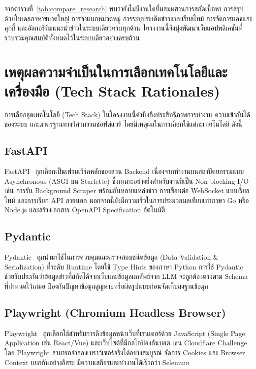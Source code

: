 จากตารางที่~\ref{tab:compare_research} พบว่ายังไม่มีงานใดที่ผสมผสานการสกัดเนื้อหา การสรุปด้วยโมเดลภาษาขนาดใหญ่ การจำแนกหมวดหมู่ การระบุประเด็นข่าวแบบเรียลไทม์ การจัดการแคชและคุกกี้ และอัลกอริทึมแนะนำข่าวในระบบเดียวครบทุกด้าน โครงงานนี้จึงมุ่งพัฒนาเว็บแอปพลิเคชันที่รวบรวมคุณสมบัติทั้งหมดไว้ในระบบเดียวอย่างครบถ้วน

\section{เหตุผลความจำเป็นในการเลือกเทคโนโลยีและเครื่องมือ (Tech Stack Rationales)}

การเลือกชุดเทคโนโลยี (Tech Stack) ในโครงงานนี้คำนึงถึงประสิทธิภาพการทำงาน ความเข้ากันได้ของระบบ และมาตรฐานทางวิศวกรรมซอฟต์แวร์ โดยมีเหตุผลในการเลือกใช้แต่ละเทคโนโลยี ดังนี้

\subsection{FastAPI}
FastAPI~\parencite{fastapi2024} ถูกเลือกเป็นเฟรมเวิร์คหลักของส่วน Backend เนื่องจากทำงานบนสถาปัตยกรรมแบบ Asynchronous (ASGI บน Starlette) ซึ่งเหมาะอย่างยิ่งสำหรับงานที่เป็น Non-blocking I/O เช่น การรัน Background Scraper พร้อมกันหลายแหล่งข่าว การเชื่อมต่อ WebSocket แบบเรียลไทม์ และการเรียก API ภายนอก นอกจากนี้ยังมีความเร็วในการประมวลผลเทียบเท่าภาษา Go หรือ Node.js และสร้างเอกสาร OpenAPI Specification อัตโนมัติ

\subsection{Pydantic}
Pydantic~\parencite{pydantic2024} ถูกนำมาใช้ในการควบคุมและตรวจสอบชนิดข้อมูล (Data Validation \& Serialization) ที่ระดับ Runtime โดยใช้ Type Hints ของภาษา Python การใช้ Pydantic ช่วยรับประกันว่าข้อมูลข่าวที่สกัดได้จากเว็บและข้อมูลผลลัพธ์จาก LLM จะถูกต้องตรงตาม Schema ที่กำหนดไว้เสมอ ป้องกันปัญหาข้อมูลสูญหายหรือผิดรูปแบบก่อนจัดเก็บลงฐานข้อมูล

\subsection{Playwright (Chromium Headless Browser)}
Playwright~\parencite{playwright2024} ถูกเลือกใช้สำหรับการดึงข้อมูลหน้าเว็บที่เรนเดอร์ด้วย JavaScript (Single Page Application เช่น React/Vue) และเว็บไซต์ที่มีกลไกป้องกันบอต เช่น Cloudflare Challenge โดย Playwright สามารถจำลองเบราว์เซอร์จริงได้อย่างสมบูรณ์ จัดการ Cookies และ Browser Context แยกกันอย่างอิสระ มีความเสถียรและทำงานได้เร็วกว่า Selenium

